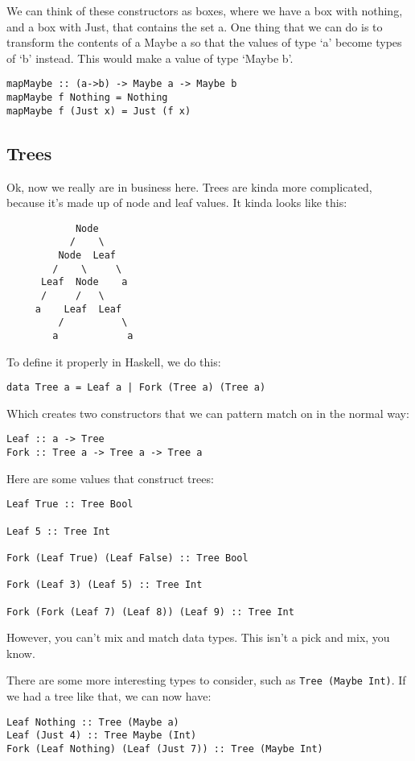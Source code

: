 \documentclass[11pt,a4paper,titlepage]{scrartcl}
\begin{document}
We can think of these constructors as boxes, where we have a box with
nothing, and a box with Just, that contains the set a. One thing that we
can do is to transform the contents of a Maybe a so that the values of
type `a' become types of `b' instead. This would make a value of type
`Maybe b'.
\begin{lstlisting}
mapMaybe :: (a->b) -> Maybe a -> Maybe b
mapMaybe f Nothing = Nothing
mapMaybe f (Just x) = Just (f x)
\end{lstlisting}

\subsection{Trees}%
\label{sub:Trees}
Ok, now we really are in business here. Trees are kinda more complicated,
because it's made up of node and leaf values. It kinda looks like this:
\begin{lstlisting}
            Node
           /    \
         Node  Leaf
        /    \     \
      Leaf  Node    a
      /     /   \
     a    Leaf  Leaf
         /          \
        a            a
\end{lstlisting}

To define it properly in Haskell, we do this:
\begin{lstlisting}
data Tree a = Leaf a | Fork (Tree a) (Tree a)
\end{lstlisting}

Which creates two constructors that we can pattern match on in the normal
way:
\begin{lstlisting}
Leaf :: a -> Tree
Fork :: Tree a -> Tree a -> Tree a
\end{lstlisting}

Here are some values that construct trees:
\begin{lstlisting}
Leaf True :: Tree Bool

Leaf 5 :: Tree Int

Fork (Leaf True) (Leaf False) :: Tree Bool

Fork (Leaf 3) (Leaf 5) :: Tree Int

Fork (Fork (Leaf 7) (Leaf 8)) (Leaf 9) :: Tree Int
\end{lstlisting}

However, you can't mix and match data types. This isn't a pick and mix,
you know.

There are some more interesting types to consider, such as \lstinline|Tree (Maybe Int)|.
If we had a tree like that, we can now have:
\begin{lstlisting}
Leaf Nothing :: Tree (Maybe a)
Leaf (Just 4) :: Tree Maybe (Int)
Fork (Leaf Nothing) (Leaf (Just 7)) :: Tree (Maybe Int)
\end{lstlisting}
\end{document}
